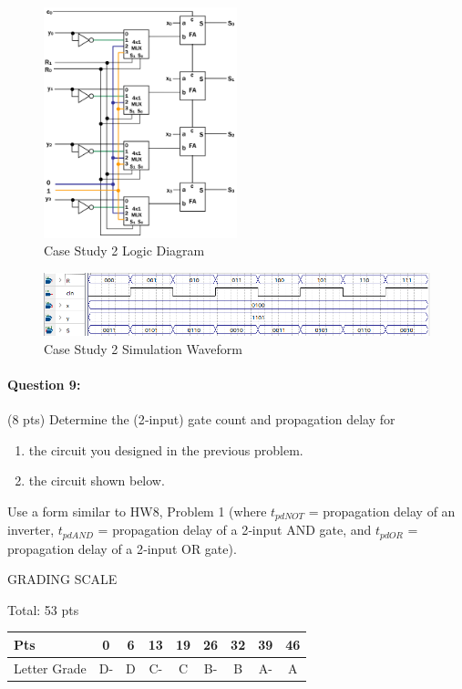 \documentclass[12pt,letterpaper,titlepage]{report}
\begin{document}
\begin{raggedright}
\begin{center}
\end{center}

\begin{figure}[ht]
\centering
\includegraphics[width=0.5\textwidth, height=\textheight, keepaspectratio=true]{hw9p8a}
\caption{Case Study 2 Logic Diagram}
\end{figure}
\clearpage

\begin{figure}[ht]
\centering
\includegraphics[width=\textwidth, height=\textheight, keepaspectratio=true]{hw9p8b}
\caption{Case Study 2 Simulation Waveform}
\end{figure}
\clearpage

\paragraph{Question 9:}
(8 pts) Determine the (2‐input) gate count and propagation delay for
\begin{enumerate} [noitemsep, label=\alph*)]
\item the circuit you designed in the previous problem.
\item the circuit shown below. 
\end{enumerate}
Use a form similar to HW8, Problem 1 (where $t_{pdNOT}$ = propagation delay of an inverter, $t_{pdAND}$ = propagation delay of a 2‐input AND gate, and $t_{pdOR}$ = propagation delay of a 2‐input OR gate).


\vspace{\fill}
\noindent
GRADING SCALE
\medskip

Total: 53 pts
\bigskip

\def\arraystretch{1.5} 
\begin{tabular}{ | l | c | c | c | c | c | c | c | c | } \hline
Pts          & 0  & 6  & 13 & 19 & 26 & 32 & 39 & 46     \\\hline
Letter Grade & D- & D  & C- & C  & B- & B  & A- & A      \\\hline
\end{tabular}
\end{raggedright}
\end{document}
